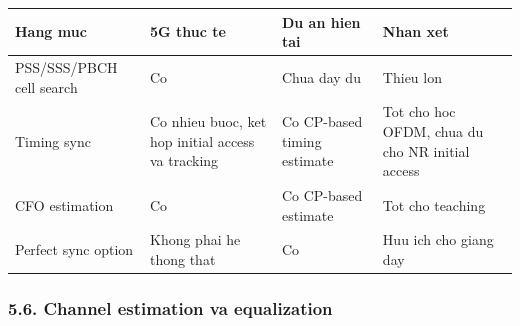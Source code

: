 \documentclass[
  vietnamese,
  a4paper,
  11pt]{article}
\newcounter{none} %
\begin{document}
{\def\LTcaptype{none} %
\begin{longtable}[]{@{}
  >{\raggedright\arraybackslash}p{}
  >{\raggedright\arraybackslash}p{}
  >{\raggedright\arraybackslash}p{}
  >{\raggedright\arraybackslash}p{}@{}}
\toprule\noalign{}
\begin{minipage}[b]{\linewidth}\raggedright
Hang muc
\end{minipage} & \begin{minipage}[b]{\linewidth}\raggedright
5G thuc te
\end{minipage} & \begin{minipage}[b]{\linewidth}\raggedright
Du an hien tai
\end{minipage} & \begin{minipage}[b]{\linewidth}\raggedright
Nhan xet
\end{minipage} \\
\midrule\noalign{}
\endhead
\bottomrule\noalign{}
\endlastfoot
PSS/SSS/PBCH cell search & Co & Chua day du & Thieu lon \\
Timing sync & Co nhieu buoc, ket hop initial access va tracking & Co
CP-based timing estimate & Tot cho hoc OFDM, chua du cho NR initial
access \\
CFO estimation & Co & Co CP-based estimate & Tot cho teaching \\
Perfect sync option & Khong phai he thong that & Co & Huu ich cho giang
day \\
\end{longtable}
}

\subsubsection{5.6. Channel estimation va
equalization}\label{channel-estimation-va-equalization}
\end{document}
